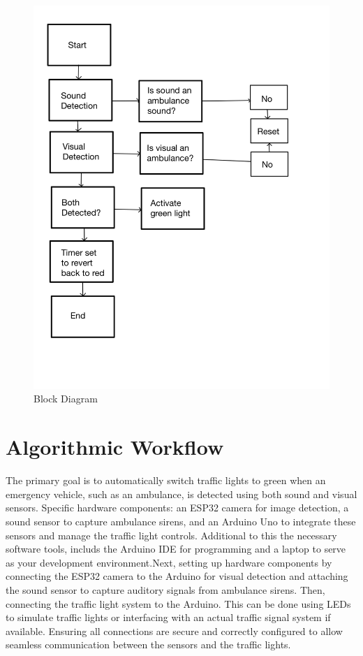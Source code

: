 \documentclass[conference]{IEEEtran}
\begin{document}
\begin{figure}[htbp]
    \centering \includegraphics[width=1\linewidth]{Untitled Notebook (1)-5.jpg}
    \caption{Block Diagram}
    \label{fig:enter-label}
\end{figure}



\section{Algorithmic Workflow}

The primary goal is to automatically switch traffic lights to green when an emergency vehicle, such as an ambulance, is detected using both sound and visual sensors. Specific hardware components: an ESP32 camera for image detection, a sound sensor to capture ambulance sirens, and an Arduino Uno to integrate these sensors and manage the traffic light controls. Additional to this the necessary software tools, includs the Arduino IDE for programming and a laptop to serve as your development environment.Next, setting up hardware components by connecting the ESP32 camera to the Arduino for visual detection and attaching the sound sensor to capture auditory signals from ambulance sirens. Then, connecting the traffic light system to the Arduino. This can be done using LEDs to simulate traffic lights or interfacing with an actual traffic signal system if available. Ensuring all connections are secure and correctly configured to allow seamless communication between the sensors and the traffic lights.
\end{document}
